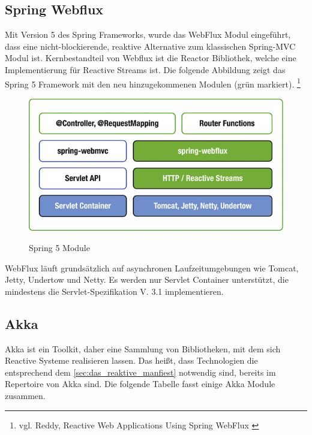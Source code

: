 \subsection{Spring Webflux}
Mit Version 5 des Spring Frameworks, wurde das WebFlux Modul eingeführt, dass eine nicht-blockierende, reaktive Alternative zum klassischen Spring-MVC Modul ist. Kernbestandteil von Webflux ist die Reactor Bibliothek, welche eine Implementierung für Reactive Streams ist. Die folgende Abbildung zeigt das Spring 5 Framework mit den neu hinzugekommenen Modulen (grün markiert). \footnote{vgl. Reddy, Reactive Web Applications Using Spring WebFlux \cite{buch:beginning_spring_boot2:kapitel12} \label{webflux:book}}

\begin{center}
\begin{figure}[H]
    \caption{Spring 5 Module}
    \includegraphics[width=\linewidth]{media/Spring5-runtime}
    \label{spring5-runtime}
\end{figure}
\end{center}

WebFlux läuft grundsätzlich auf asynchronen Laufzeitumgebungen wie Tomcat, Jetty, Undertow und Netty. Es werden nur Servlet Container unterstützt, die mindestens die Servlet-Spezifikation V. 3.1 implementieren. 

\subsection{Akka}
Akka ist ein Toolkit, daher eine Sammlung von Bibliotheken, mit dem sich Reactive Systeme realisieren lassen. Das heißt, dass Technologien die entsprechend dem  \autoref{sec:das_reaktive_manfiest} notwendig sind, bereits im Repertoire von Akka sind. Die folgende Tabelle fasst einige Akka Module zusammen.

